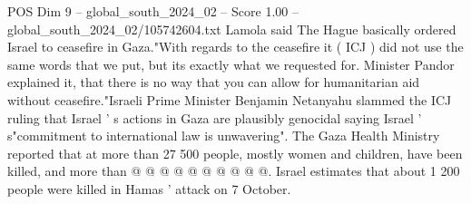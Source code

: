 \begin{textsample}{POS Dim 9 – global\_south\_2024\_02 – Score 1.00 – global\_south\_2024\_02/105742604.txt}
Lamola said The Hague basically ordered Israel to ceasefire in Gaza."With regards to the ceasefire it ( ICJ ) did not use the same words that we put, but its exactly what we requested for.
Minister Pandor explained it, that there is no way that you can allow for humanitarian aid without ceasefire."Israeli Prime Minister Benjamin Netanyahu slammed the ICJ ruling that Israel ' s actions in Gaza are plausibly genocidal saying Israel ' s"commitment to international law is unwavering".
The Gaza Health Ministry reported that at more than 27 500 people, mostly women and children, have been killed, and more than @ @ @ @ @ @ @ @ @ @.
Israel estimates that about 1 200 people were killed in Hamas ' attack on 7 October.

\end{textsample}
